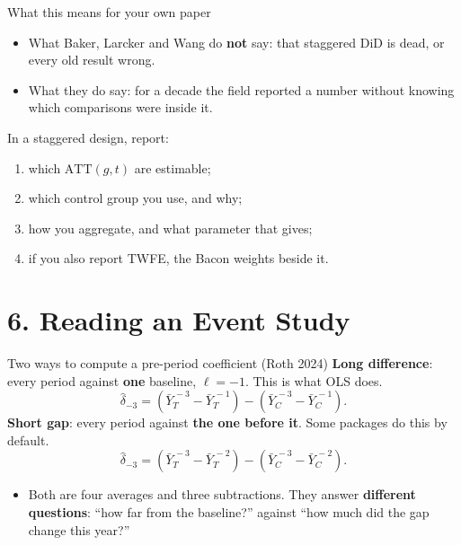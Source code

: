 \documentclass[
  11pt,
  ignorenonframetext,
  aspectratio=169,
]{beamer}
\providecommand{\tightlist}{%
  \setlength{\itemsep}{0pt}\setlength{\parskip}{0pt}}
\begin{document}
\begin{frame}{What this means for your own paper}
\protect{}\label{what-this-means-for-your-own-paper}
\begin{itemize}
\tightlist
\item
  What Baker, Larcker and Wang do \textbf{not} say: that staggered DiD
  is dead, or every old result wrong.
\item
  What they do say: for a decade the field reported a number without
  knowing which comparisons were inside it.
\end{itemize}

\vspace{0.4em}

In a staggered design, report:

\begin{enumerate}
\tightlist
\item
  which \(\text{ATT}(g, t)\) are estimable;
\item
  which control group you use, and why;
\item
  how you aggregate, and what parameter that gives;
\item
  if you also report TWFE, the Bacon weights beside it.
\end{enumerate}
\end{frame}

\section{6. Reading an Event Study}\label{reading-an-event-study}

\begin{frame}{Two ways to compute a pre-period coefficient (Roth 2024)}
\protect{}\label{two-ways-to-compute-a-pre-period-coefficient-roth-2024}
\textbf{Long difference}: every period against \textbf{one} baseline,
\(\ell = -1\). This is what OLS does. \[
\hat\delta_{-3} = (\bar Y_T^{\,-3} - \bar Y_T^{\,-1}) - (\bar Y_C^{\,-3} - \bar Y_C^{\,-1}).
\] \textbf{Short gap}: every period against \textbf{the one before it}.
Some packages do this by default. \[
\hat\delta_{-3} = (\bar Y_T^{\,-3} - \bar Y_T^{\,-2}) - (\bar Y_C^{\,-3} - \bar Y_C^{\,-2}).
\]

\begin{itemize}
\tightlist
\item
  Both are four averages and three subtractions. They answer
  \textbf{different questions}: ``how far from the baseline?'' against
  ``how much did the gap change this year?''
\end{itemize}
\end{frame}
\end{document}
